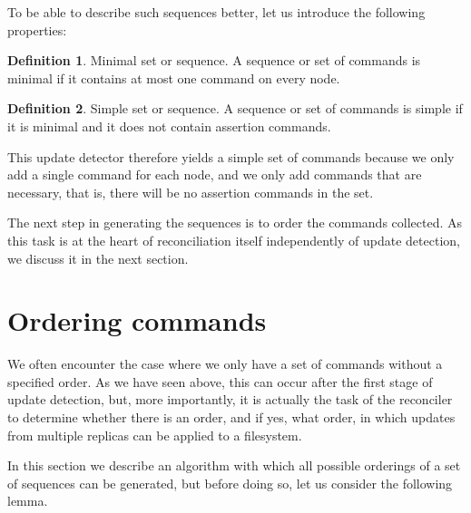 \documentclass[12pt]{article}
\theoremstyle{definition}
\newtheorem{mydef}{Definition}
\begin{document}
To be able to describe such sequences better, let us introduce the following properties:

\begin{mydef}{Minimal set or sequence.}
A sequence or set of commands is minimal if it contains at most one command on every node.
\end{mydef}

\begin{mydef}{Simple set or sequence.}
A sequence or set of commands is simple if it is minimal and it does not contain assertion commands.
\end{mydef}

This update detector therefore yields a simple set of commands because we only add a single command
for each node, and we only add commands that are necessary, that is, there will be no 
assertion commands in the set.

The next step in generating the sequences is to order the commands collected.
As this task is at the heart of reconciliation itself independently of update detection,
we discuss it in the next section.



\section{Ordering commands}

We often encounter the case where we only have a set of commands without a specified order.
As we have seen above, this can occur after the first stage of update detection,
but, more importantly,
it is actually the task of the reconciler to determine whether there is an order,
and if yes, what order,
in which updates from multiple replicas can be applied to a filesystem.

In this section we describe an algorithm with which all possible orderings of a
set of sequences can be generated, but before doing so, let us consider the following lemma.
\end{document}
